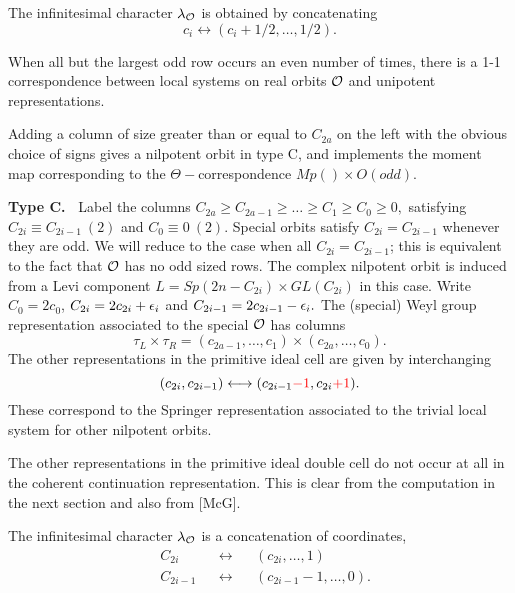 \documentclass[11pt ,reqno]{amsart}
\begin{document}
The infinitesimal character ${\lambda}_{{\mathcal O}}$ is obtained by concatenating
$$
c_{i}\longleftrightarrow (c_{i}+1/2,\dots ,1/2).
$$
\begin{remark*}
When all but the largest odd row occurs an even number of times, there
is a 1-1 correspondence between local systems on real orbits $\mathcal O$ and
unipotent representations. 
  
Adding a column of size greater than or equal to $C_{2a}$ on the left
with the obvious choice of signs gives a
nilpotent orbit in type C, and implements the moment map corresponding
to the $\Theta-$correspondence $Mp()\times O(odd).$   
\end{remark*}
\noindent\textbf{Type C.\ } Label the columns $C_{2a}\ge C_{2a-1}\ge
\dots \ge C_1\ge C_0\ge 0,$ satisfying $C_{2i}\equiv C_{2i-1}\ (2)$
and $C_0\equiv 0\ (2).$   Special orbits satisfy $C_{2i}=C_{2i-1}$ whenever
they are odd.  
We will reduce to the case when all $C_{2i}=C_{2i-1}$; this
is equivalent to the fact that ${\mathcal O}$ has no odd sized rows. 
{The complex nilpotent orbit is induced from a
  Levi component 
  $L=Sp(2n-C_{2i})\times GL(C_{2i})$ in this case}. Write
$C_0=2c_0$, $C_{2i}=2c_{2i}+{\epsilon}_i$ and $C_{2i-1}=2c_{2i-1}-{\epsilon}_i.$
The (special) Weyl group representation associated to the special ${\mathcal O}$
has columns
\begin{equation}
  \label{eq:tableauc}
\tau_L\times\tau_R=(c_{2a-1},\dots , c_1)\times (c_{2a},\dots ,c_0).
\end{equation}
The other representations in the primitive ideal cell are given by
interchanging 
\begin{equation}
  \label{eq:wccell}
 (c_{2i}, c_{2i-1})\longleftrightarrow (c_{2i-1}{\color{red} -1},c_{2i}{\color{red} +1}).  
\end{equation}
These  correspond to the Springer representation associated to the
trivial local system for other nilpotent orbits.
 
 The other representations in the primitive ideal double cell do not
 occur at all in the coherent continuation representation. This is
 clear from the computation in the next section and also from [McG].  

The infinitesimal character ${\lambda}_{{\mathcal O}}$ is a concatenation of coordinates,
\begin{equation}
\begin{aligned}
    \label{eq:inflc}
&C_{2i}&&\longleftrightarrow &&(c_{2i},\dots ,1)\\
&C_{2i-1}&&\longleftrightarrow &&(c_{2i-1}-1,\dots ,0).
\end{aligned}
\end{equation}
\end{document}
